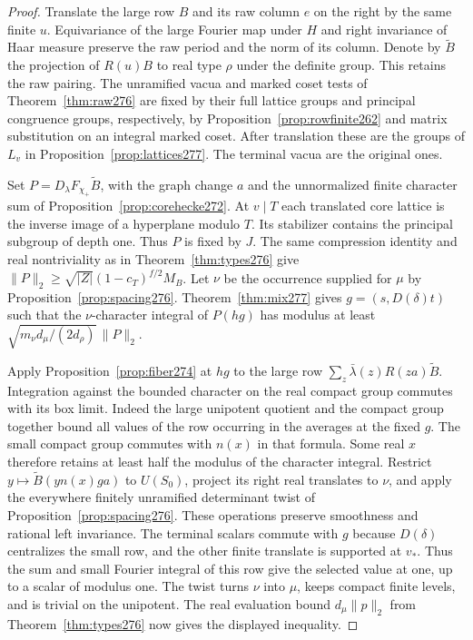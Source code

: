 \documentclass[a4paper,11pt]{article}
\theoremstyle{definition}
\theoremstyle{remark}
\numberwithin{equation}{section}
\begin{document}
\begin{proof}
Translate the large row \(B\) and its raw column \(e\) on the
right by the same finite \(u\). Equivariance of the large
Fourier map under \(H\) and right invariance of Haar measure
preserve the raw period and the norm of its column. Denote by
\(\widetilde B\) the projection of \(R(u)B\) to real type
\(\rho\) under the definite group. This retains the raw pairing.
The unramified vacua and marked coset tests of
Theorem~\ref{thm:raw276} are fixed by their full lattice
groups and principal congruence groups, respectively, by
Proposition~\ref{prop:rowfinite262} and matrix substitution
on an integral marked coset. After translation these are the
groups of \(L_v\) in Proposition~\ref{prop:lattices277}.
The terminal vacua are the original ones.

Set \(P=D_\lambda F_{\chi_+}\widetilde B\), with the graph
change \(a\) and the unnormalized finite character sum of
Proposition~\ref{prop:corehecke272}. At \(v\mid T\) each
translated core lattice is the inverse image of a hyperplane
modulo \(T\). Its stabilizer contains the principal subgroup
of depth one. Thus \(P\) is fixed by \(J\). The same
compression identity and real nontriviality as in
Theorem~\ref{thm:types276} give
\(\|P\|_2\ge\sqrt{|Z|}(1-c_T)^{f/2} M_B\).
Let \(\nu\) be the occurrence supplied for \(\mu\) by
Proposition~\ref{prop:spacing276}. Theorem~\ref{thm:mix277}
gives \(g=(s,D(\delta)t)\) such that the \(\nu\)-character
integral of \(P(hg)\) has modulus at least
\(\sqrt{m_\nu d_\mu/(2d_\rho)}\,\|P\|_2\).

Apply Proposition~\ref{prop:fiber274} at \(hg\) to the
large row \(\sum_z\bar\lambda(z)R(za)\widetilde B\).
Integration against the bounded character on the real compact
group commutes with its box limit. Indeed the large unipotent
quotient and the compact group together bound all values of
the row occurring in the averages at the fixed \(g\).
The small compact group commutes with \(n(x)\) in that formula.
Some real \(x\) therefore retains at least half the modulus
of the character integral. Restrict
\(y\mapsto\widetilde B(y n(x)ga)\) to \(U(S_0)\), project
its right real translates to \(\nu\), and apply the
everywhere finitely unramified determinant twist of
Proposition~\ref{prop:spacing276}. These operations preserve
smoothness and rational left invariance. The terminal
scalars commute with \(g\) because \(D(\delta)\) centralizes
the small row, and the other finite translate is supported at
\(v_*\). Thus the sum and small Fourier integral of this row
give the selected value at one, up to a scalar of modulus one.
The twist turns \(\nu\) into \(\mu\), keeps compact finite
levels, and is trivial on the unipotent. The real evaluation
bound \(d_\mu\|p\|_2\) from Theorem~\ref{thm:types276}
now gives the displayed inequality.


\end{proof}
\end{document}

